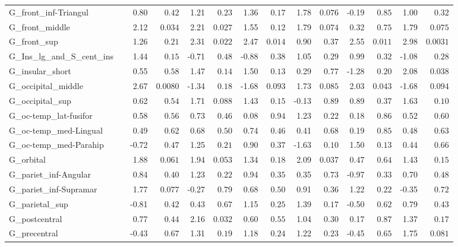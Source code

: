 {\begin{longtable}{llrrrrrrrrrrrr}
G\_front\_inf-Triangul &  & 0.80 & $0.42$ & 1.21 & $0.23$ & 1.36 & $0.17$ & 1.78 & $0.076$ & -0.19 & $0.85$ & 1.00 & $0.32$ \\
G\_front\_middle &  & 2.12 & $0.034$ & 2.21 & $0.027$ & 1.55 & $0.12$ & 1.79 & $0.074$ & 0.32 & $0.75$ & 1.79 & $0.075$ \\
G\_front\_sup &  & 1.26 & $0.21$ & 2.31 & $0.022$ & 2.47 & $0.014$ & 0.90 & $0.37$ & 2.55 & $0.011$ & 2.98 & $0.0031$ \\
G\_Ins\_lg\_and\_S\_cent\_ins &  & 1.44 & $0.15$ & -0.71 & $0.48$ & -0.88 & $0.38$ & 1.05 & $0.29$ & 0.99 & $0.32$ & -1.08 & $0.28$ \\
G\_insular\_short &  & 0.55 & $0.58$ & 1.47 & $0.14$ & 1.50 & $0.13$ & 0.29 & $0.77$ & -1.28 & $0.20$ & 2.08 & $0.038$ \\
G\_occipital\_middle &  & 2.67 & $0.0080$ & -1.34 & $0.18$ & -1.68 & $0.093$ & 1.73 & $0.085$ & 2.03 & $0.043$ & -1.68 & $0.094$ \\
G\_occipital\_sup &  & 0.62 & $0.54$ & 1.71 & $0.088$ & 1.43 & $0.15$ & -0.13 & $0.89$ & 0.89 & $0.37$ & 1.63 & $0.10$ \\
G\_oc-temp\_lat-fusifor &  & 0.58 & $0.56$ & 0.73 & $0.46$ & 0.08 & $0.94$ & 1.23 & $0.22$ & 0.18 & $0.86$ & 0.52 & $0.60$ \\
G\_oc-temp\_med-Lingual &  & 0.49 & $0.62$ & 0.68 & $0.50$ & 0.74 & $0.46$ & 0.41 & $0.68$ & 0.19 & $0.85$ & 0.48 & $0.63$ \\
G\_oc-temp\_med-Parahip &  & -0.72 & $0.47$ & 1.25 & $0.21$ & 0.90 & $0.37$ & -1.63 & $0.10$ & 1.50 & $0.13$ & 0.44 & $0.66$ \\
G\_orbital &  & 1.88 & $0.061$ & 1.94 & $0.053$ & 1.34 & $0.18$ & 2.09 & $0.037$ & 0.47 & $0.64$ & 1.43 & $0.15$ \\
G\_pariet\_inf-Angular &  & 0.84 & $0.40$ & 1.23 & $0.22$ & 0.94 & $0.35$ & 0.35 & $0.73$ & -0.97 & $0.33$ & 0.70 & $0.48$ \\
G\_pariet\_inf-Supramar &  & 1.77 & $0.077$ & -0.27 & $0.79$ & 0.68 & $0.50$ & 0.91 & $0.36$ & 1.22 & $0.22$ & -0.35 & $0.72$ \\
G\_parietal\_sup &  & -0.81 & $0.42$ & 0.43 & $0.67$ & 1.15 & $0.25$ & 1.39 & $0.17$ & -0.50 & $0.62$ & 0.79 & $0.43$ \\
G\_postcentral &  & 0.77 & $0.44$ & 2.16 & $0.032$ & 0.60 & $0.55$ & 1.04 & $0.30$ & 0.17 & $0.87$ & 1.37 & $0.17$ \\
G\_precentral &  & -0.43 & $0.67$ & 1.31 & $0.19$ & 1.18 & $0.24$ & 1.22 & $0.23$ & -0.45 & $0.65$ & 1.75 & $0.081$ \\

\end{longtable}}
